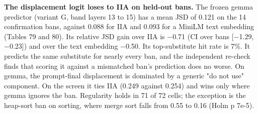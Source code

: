 \documentclass[11pt,letterpaper]{article}
\begin{document}
\endgroup
\textbf{The displacement logit loses to IIA on held-out bans.} The frozen gemma predictor (variant G, band layers 13 to 15) has a mean JSD of 0.121 on the 14 confirmation bans, against 0.088 for IIA and 0.093 for a MiniLM text embedding (Tables 79 and 80). Its relative JSD gain over IIA is \ensuremath{-}0.71 (CI over bans [\ensuremath{-}1.29, \ensuremath{-}0.23]) and over the text embedding \ensuremath{-}0.50. Its top-substitute hit rate is 7\%. It predicts the same substitute for nearly every ban, and the independent re-check finds that scoring it against a mismatched ban's prediction does no worse. On gemma, the prompt-final displacement is dominated by a generic "do not use" component. On the screen it ties IIA (0.249 against 0.254) and wins only where gemma ignores the ban. Regularity holds in 71 of 72 cells; the exception is the heap-sort ban on sorting, where merge sort falls from 0.55 to 0.16 (Holm p 7e-5).
\end{document}
